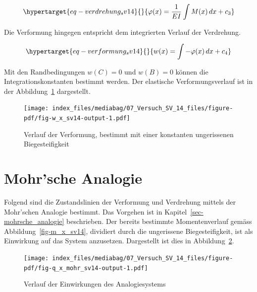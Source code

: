\documentclass[
  12pt,
  letterpaper,
  egregdoesnotlikesansseriftitles]{scrreprt}
\begin{document}
\begin{equation}\protect\hypertarget{eq-verdrehung_sv14}{}{
\varphi(x) = \frac{1}{EI}\int M(x) \, dx + c_3
}\label{eq-verdrehung_sv14}\end{equation}

Die Verformung hingegen entspricht dem integrierten Verlauf der
Verdrehung.

\begin{equation}\protect\hypertarget{eq-verformung_sv14}{}{
w(x) = \int -\varphi(x) \, dx + c_4
}\label{eq-verformung_sv14}\end{equation}

Mit den Randbedingungen \(w(C) = 0\) und \(w(B) = 0\) können die
Integrationskonstanten bestimmt werden. Der elastische
Verformungsverlauf ist in der Abbildung~\ref{fig-w_x_sv14} dargestellt.

\begin{figure}[H]

{\centering \texttt{[image: index\_files/mediabag/07\_Versuch\_SV\_14\_files/figure-pdf/fig-w\_x\_sv14-output-1.pdf]}

}

\caption{\label{fig-w_x_sv14}Verlauf der Verformung, bestimmt mit einer
konstanten ungerissenen Biegesteifigkeit}

\end{figure}

\hypertarget{mohrsche-analogie-1}{%
\section{Mohr'sche Analogie}\label{mohrsche-analogie-1}}

Folgend sind die Zustandslinien der Verformung und Verdrehung mittels
der Mohr'schen Analogie bestimmt. Das Vorgehen ist in
Kapitel~\ref{sec-mohrsche_analogie} beschrieben. Der bereits bestimmte
Momentenverlauf gemäss Abbildung~\ref{fig-m_x_sv14}, dividiert durch die
ungerissene Biegesteifigkeit, ist als Einwirkung auf das System
anzusetzen. Dargestellt ist dies in Abbildung~\ref{fig-q_x_mohr_sv14}.

\begin{figure}[H]

{\centering \texttt{[image: index\_files/mediabag/07\_Versuch\_SV\_14\_files/figure-pdf/fig-q\_x\_mohr\_sv14-output-1.pdf]}

}

\caption{\label{fig-q_x_mohr_sv14}Verlauf der Einwirkungen des
Analogiesystems}

\end{figure}
\end{document}
